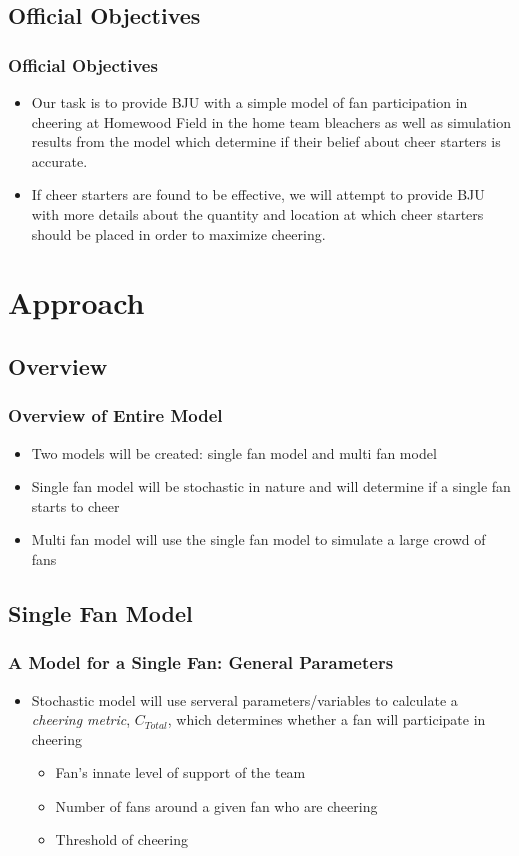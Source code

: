 \documentclass[compress,handout,10pt]{beamer}
\let\olditem\item
\renewcommand{\item}{\setlength{\itemsep}{0.5\baselineskip}\olditem}
\begin{document}
\subsection{Official Objectives}

\begin{frame}
	\frametitle {Official Objectives}
	\begin {itemize}
		\item Our task is to provide BJU with a simple model of fan participation in cheering at Homewood Field in the home team bleachers as well as simulation results from the model which determine if their belief about cheer starters is accurate.
		\item If cheer starters are found to be effective, we will attempt to provide BJU with more details about the quantity and location at which cheer starters should be placed in order to maximize cheering.
		\end {itemize}
\end{frame}

\section {Approach}

\subsection {Overview}

\begin {frame}
	\frametitle {Overview of Entire Model}
	\begin{itemize}
		\item Two models will be created: single fan model and multi fan model
		\item Single fan model will be stochastic in nature and will determine if a single fan starts to cheer
		\item Multi fan model will use the single fan model to simulate a large crowd of fans
	\end{itemize}
\end {frame}

\subsection{Single Fan Model}

\begin {frame}
	\frametitle {A Model for a Single Fan: General Parameters}
	\begin{itemize}
		\item Stochastic model will use serveral parameters/variables to calculate a \emph{cheering metric}, $C_{Total}$, which determines whether a fan will participate in cheering
		\begin{itemize}
			\item Fan's innate level of support of the team
			\item Number of fans around a given fan who are cheering
			\item Threshold of cheering 
		\end{itemize}
	\end {itemize}
\end {frame}
\end{document}
